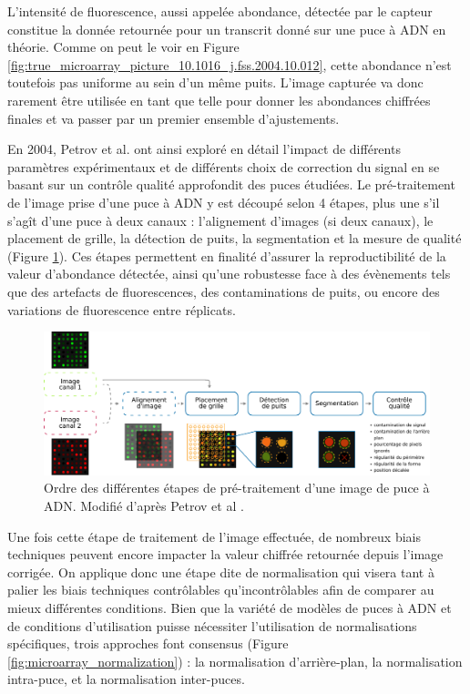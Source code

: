 L'intensité de fluorescence, aussi appelée abondance, détectée par le capteur constitue la donnée retournée pour un transcrit donné sur une puce à ADN en théorie. Comme on peut le voir en Figure \ref{fig:true_microarray_picture_10.1016_j.fss.2004.10.012}, cette abondance n'est toutefois pas uniforme au sein d'un même puits. L'image capturée va donc rarement être utilisée en tant que telle pour donner les abondances chiffrées finales et va passer par un premier ensemble d'ajustements.

En 2004, Petrov et al. \cite{Petrov2004Nov} ont ainsi exploré en détail l'impact de différents paramètres expérimentaux et de différents choix de correction du signal en se basant sur un contrôle qualité approfondit des puces étudiées. Le pré-traitement de l'image prise d'une puce à ADN y est découpé selon 4 étapes, plus une s'il s'agît d'une puce à deux canaux : l'alignement d'images (si deux canaux), le placement de grille, la détection de puits, la segmentation et la mesure de qualité (Figure \ref{fig:microarray_image_preprocessing}). Ces étapes permettent en finalité d'assurer la reproductibilité de la valeur d'abondance détectée, ainsi qu'une robustesse face à des évènements tels que des artefacts de fluorescences, des contaminations de puits, ou encore des variations de fluorescence entre réplicats.

\begin{figure}[!h]
    \centering
    \includegraphics[width=\textwidth]{img/intro/microarray_image_preprocessing.pdf}
    \caption{Ordre des différentes étapes de pré-traitement d'une image de puce à ADN. Modifié d'après Petrov et al \cite{Petrov2004Nov}.}
    \label{fig:microarray_image_preprocessing}
\end{figure}

Une fois cette étape de traitement de l'image effectuée, de nombreux biais techniques peuvent encore impacter la valeur chiffrée retournée depuis l'image corrigée. On applique donc une étape dite de normalisation qui visera tant à palier les biais techniques contrôlables qu'incontrôlables afin de comparer au mieux différentes conditions. Bien que la variété de modèles de puces à ADN et de conditions d'utilisation puisse nécessiter l'utilisation de normalisations spécifiques, trois approches font consensus \cite{Smyth2003Dec} (Figure \ref{fig:microarray_normalization}) : la normalisation d'arrière-plan, la normalisation intra-puce, et la normalisation inter-puces.

